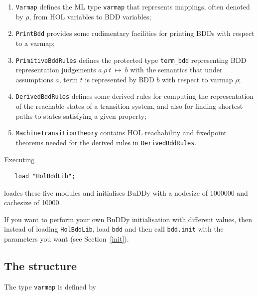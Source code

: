 \documentclass[12pt,fleqn]{article}
\renewcommand{\t}[1]{\mbox{\tt #1}}
\newcommand{\termbdd}[4]{\mbox{$#1~#2~#3~\mapsto~#4$}}
\newcommand\termbddty{\texttt{term\_bdd}{}}
\newcommand{\Buddy}{BuDDy{}}
\begin{document}
\begin{enumerate}
\item \t{Varmap} defines the ML type \t{varmap} that represents mappings,
often denoted by $\rho$,
from HOL variables to BDD variables;

\item \t{PrintBdd} provides some rudimentary facilities for printing
BDDs with respect to a varmap;

\item \t{PrimitiveBddRules} defines the protected type \termbddty
representing BDD representation judgements \termbdd{a}{\rho}{t}{b}
with the semantics that under assumptions $a$, term $t$ is represented by BDD $b$ with respect to
varmap $\rho$;

\item \t{DerivedBddRules} defines some derived rules for computing
the representation of the reachable states of a transition system,
and also for finding shortest paths to states  satisfying a given property;

\item \t{MachineTransitionTheory} contains HOL reachability and fixedpoint theorems needed
for the derived rules in  \t{DerivedBddRules}.


\end{enumerate}


Executing

\vspace*{-2mm}

\begin{verbatim}
   load "HolBddLib";
\end{verbatim}

\vspace*{-2mm}

loades these five modules and
initialises \Buddy{} with a nodesize of 1000000
and cachesize of 10000.

If you want to perform your own \Buddy{} initialisation with different
values, then instead of loading \t{HolBddLib}, load \t{bdd} and then
call \t{bdd.init} with the parameters you want (see Section~\ref{init}).

\subsection{The structure }\label{Varmap}

The type \t{varmap} is defined by

\vspace*{-2mm}
\end{document}
